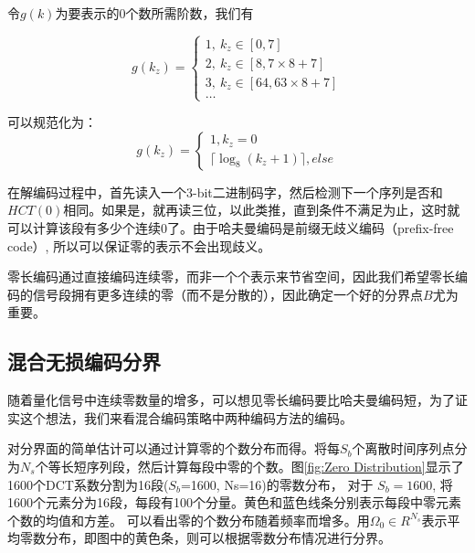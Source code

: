 令$g(k)$为要表示的0个数所需阶数，我们有


\begin{equation*}
  g(k_z)=\left\{
    \begin{array}{lr}
        1,\ k_z\in[0,7]\\
        2,\ k_z\in[8,7\times8+7]\\
        3,\ k_z\in[64,63\times8+7]\\
        \ldots
    \end{array}
  \right.
\end{equation*}


可以规范化为：
\begin{equation}\label{Eq:g(kz) definition}
  g(k_z)=\left\{
    \begin{array}{lr}
        1,k_z=0\\
        \lceil \log_8(k_z+1) \rceil,else
    \end{array}
  \right.
\end{equation}

在解编码过程中，首先读入一个3-bit二进制码字，然后检测下一个序列是否和$HCT(0)$相同。如果是，就再读三位，以此类推，直到条件不满足为止，这时就可以计算该段有多少个连续0了。由于哈夫曼编码是前缀无歧义编码（prefix-free code）, 所以可以保证零的表示不会出现歧义。

零长编码通过直接编码连续零，而非一个个表示来节省空间，因此我们希望零长编码的信号段拥有更多连续的零（而不是分散的），因此确定一个好的分界点$B$尤为重要。








\subsection{混合无损编码分界}\label{sec:delimerate}
随着量化信号中连续零数量的增多，可以想见零长编码要比哈夫曼编码短，为了证实这个想法，我们来看混合编码策略中两种编码方法的编码。

对分界面的简单估计可以通过计算零的个数分布而得。将每$S_b$个离散时间序列点分为$N_s$个等长短序列段，然后计算每段中零的个数。图\ref{fig:Zero Distribution}显示了1600个DCT系数分割为16段($S_b$=1600, Ns=16)的零数分布， 对于 $S_b=1600$, 将1600个元素分为16段，每段有100个分量。黄色和蓝色线条分别表示每段中零元素个数的均值和方差。 可以看出零的个数分布随着频率而增多。用$\Omega_0\in R^{N_s}$表示平均零数分布，即图中的黄色条，则可以根据零数分布情况进行分界。

